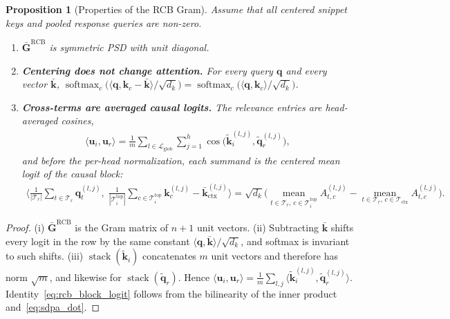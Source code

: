 \documentclass{article}
\newtheorem{proposition}{Proposition}
\begin{document}
\begin{proposition}[Properties of the RCB Gram]\label{prop:rcb}
Assume that all centered snippet keys and pooled response queries are non-zero.
\begin{enumerate}
    \item[(i)] $\bar{\mathbf{G}}^{\text{RCB}}$ is symmetric PSD with unit diagonal.
    \item[(ii)] \textbf{Centering does not change attention.} For every query $\mathbf{q}$ and every vector $\bar{\mathbf{k}}$, $\operatorname{softmax}_c\big(\langle \mathbf{q}, \mathbf{k}_c - \bar{\mathbf{k}} \rangle / \sqrt{d_k}\big) = \operatorname{softmax}_c\big(\langle \mathbf{q}, \mathbf{k}_c \rangle / \sqrt{d_k}\big)$.
    \item[(iii)] \textbf{Cross-terms are averaged causal logits.} The relevance entries are head-averaged cosines,
    \begin{align}
        \langle \mathbf{u}_i, \mathbf{u}_r \rangle = \frac{1}{m} \sum_{l \in \mathcal{L}_{\text{glob}}} \sum_{j=1}^h \cos\big(\tilde{\mathbf{k}}_i^{(l,j)}, \tilde{\mathbf{q}}_r^{(l,j)}\big),
    \end{align}
    and before the per-head normalization, each summand is the centered mean logit of the causal block:
    \begin{align}\label{eq:rcb_block_logit}
        \Big\langle \frac{1}{|\mathcal{T}_r|} \sum_{t \in \mathcal{T}_r} \mathbf{q}_t^{(l,j)}, \; \frac{1}{|\mathcal{T}_i^{\text{top}}|} \sum_{c \in \mathcal{T}_i^{\text{top}}} \mathbf{k}_c^{(l,j)} - \bar{\mathbf{k}}_{\text{ctx}}^{(l,j)} \Big\rangle = \sqrt{d_k} \Big( \operatorname*{mean}_{t \in \mathcal{T}_r,\, c \in \mathcal{T}_i^{\text{top}}} A^{(l,j)}_{t,c} - \operatorname*{mean}_{t \in \mathcal{T}_r,\, c \in \mathcal{T}_{\text{ctx}}} A^{(l,j)}_{t,c} \Big).
    \end{align}
\end{enumerate}
\end{proposition}

\begin{proof}
(i) $\bar{\mathbf{G}}^{\text{RCB}}$ is the Gram matrix of $n+1$ unit vectors. (ii) Subtracting $\bar{\mathbf{k}}$ shifts every logit in the row by the same constant $\langle \mathbf{q}, \bar{\mathbf{k}} \rangle / \sqrt{d_k}$, and softmax is invariant to such shifts. (iii) $\operatorname{stack}(\tilde{\mathbf{k}}_i)$ concatenates $m$ unit vectors and therefore has norm $\sqrt{m}$, and likewise for $\operatorname{stack}(\tilde{\mathbf{q}}_r)$. Hence $\langle \mathbf{u}_i, \mathbf{u}_r \rangle = \frac{1}{m} \sum_{l,j} \langle \tilde{\mathbf{k}}_i^{(l,j)}, \tilde{\mathbf{q}}_r^{(l,j)} \rangle$. Identity~\eqref{eq:rcb_block_logit} follows from the bilinearity of the inner product and~\eqref{eq:sdpa_dot}.
\end{proof}
\end{document}

